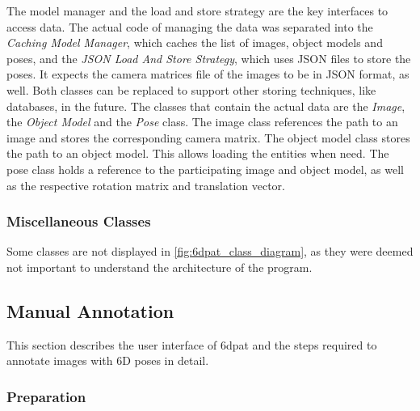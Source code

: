 The model manager and the load and store strategy are the key interfaces to access data. The actual code of managing the data was separated into the \textit{Caching Model Manager}, which caches the list of images, object models and poses, and the \textit{JSON Load And Store Strategy}, which uses JSON files to store the poses. It expects the camera matrices file of the images to be in JSON format, as well. Both classes can be replaced to support other storing techniques, like databases, in the future. The classes that contain the actual data are the \textit{Image}, the \textit{Object Model} and the \textit{Pose} class. The image class references the path to an image and stores the corresponding camera matrix. The object model class stores the path to an object model. This allows loading the entities when need. The pose class holds a reference to the participating image and object model, as well as the respective rotation matrix and translation vector. 

\subsubsection{Miscellaneous Classes}

Some classes are not displayed in \fig \ref{fig:6dpat_class_diagram}, as they were deemed not important to understand the architecture of the program.

\subsection{Manual Annotation} 

This section describes the user interface of \ac{6dpat} and the steps required to annotate images with 6D poses in detail. 

\subsubsection{Preparation}

